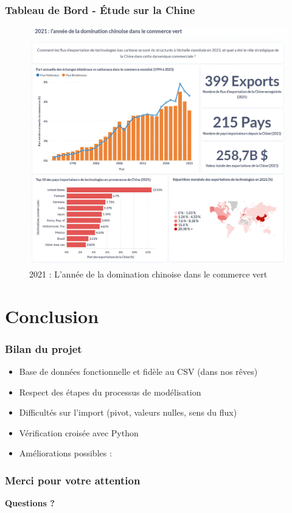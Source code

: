 \documentclass[11pt]{beamer}
\begin{document}
\begin{frame}[fragile]
  \frametitle{Tableau de Bord - Étude sur la Chine}
  \begin{figure}
    \centering
    \includegraphics[width=0.625\linewidth]{../script_dataviz/dash-board}
    \caption{2021 : L'année de la domination chinoise dans le commerce vert}
  \end{figure}
\end{frame}

\section{Conclusion}
\begin{frame}
  \frametitle{Bilan du projet}
  \begin{itemize}
    \item Base de données fonctionnelle et fidèle au CSV (dans nos rêves)
    \item Respect des étapes du processus de modélisation
    \item Difficultés sur l’import (pivot, valeurs nulles, sens du flux)
    \item Vérification croisée avec Python
    \item Améliorations possibles :
  \end{itemize}
\end{frame}

\begin{frame}
  \frametitle{Merci pour votre attention}
  \begin{center}
    \huge \textbf{Questions ?}
  \end{center}
\end{frame}
\end{document}
